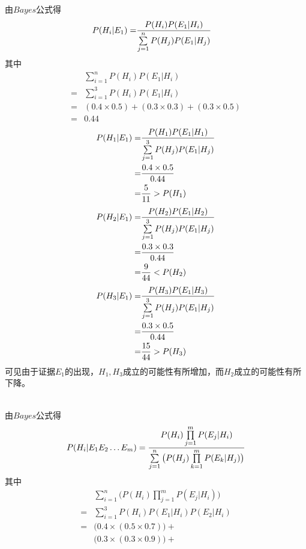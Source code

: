 \begin{answer}
\ 
\begin{subanswer}
    \ \\
    由$Bayes$公式得
    \begin{align}
    P(H_i|E_1)=& \frac{P(H_i)P(E_1|H_i)} {\sum\limits_{j=1}^{n} P(H_j)P(E_1|H_j)}
    \end{align}
    其中
    \begin{align*}
    &\sum\limits_{i=1}^{n}P(H_i)P(E_1|H_i) \\ 
    =&\sum\limits_{i=1}^{3} P(H_i)P(E_1|H_i) \\
    =& (0.4 \times 0.5) + (0.3 \times 0.3) + (0.3 \times 0.5) \\
    =& 0.44
    \end{align*}
    \begin{align}
    P(H_1|E_1)=& \frac{P(H_1)P(E_1|H_1)} {\sum\limits_{j=1}^{3} P(H_j)P(E_1|H_j)} \notag\\
    =&\frac{0.4 \times 0.5}{0.44} \notag\\
    =&\frac{5}{11} > P(H_1)
    \end{align}
    \begin{align}
    P(H_2|E_1)=& \frac{P(H_2)P(E_1|H_2)} {\sum\limits_{j=1}^{3} P(H_j)P(E_1|H_j)} \notag\\
    =&\frac{0.3 \times 0.3}{0.44} \notag\\
    =&\frac{9}{44} < P(H_2)
    \end{align}
    \begin{align}
    P(H_3|E_1)=& \frac{P(H_3)P(E_1|H_3)} {\sum\limits_{j=1}^{3} P(H_j)P(E_1|H_j)} \notag\\
    =&\frac{0.3 \times 0.5}{0.44} \notag\\
    =&\frac{15}{44} > P(H_3)
    \end{align}
    可见由于证据$E_1$的出现，$H_1,H_3$成立的可能性有所增加，而$H_2$成立的可能性有所下降。
\end{subanswer}
\begin{subanswer}
    \ \\
    由$Bayes$公式得
    \begin{align}
    P(H_i|E_1E_2\dots E_m)= \frac{P(H_i)\prod\limits_{j=1}^{m}P(E_j|H_i)} {\sum\limits_{j=1}^{n}\big(P(H_j)\prod\limits_{k=1}^{m}P(E_k|H_j)\big)}
    \end{align}
    其中
    \begin{align*}
    &\sum\limits_{i=1}^{n}\big(P(H_i)\prod\limits_{j=1}^{m}P(E_j|H_i)\big) \\
    =&\sum\limits_{i=1}^{3}P(H_i)P(E_1|H_i)P(E_2|H_i) \\
    =&\big(0.4 \times (0.5 \times 0.7)\big)+ \\
    &\big(0.3 \times (0.3 \times 0.9)\big)+ \\

\end{align*}
\end{subanswer}
\end{answer}
